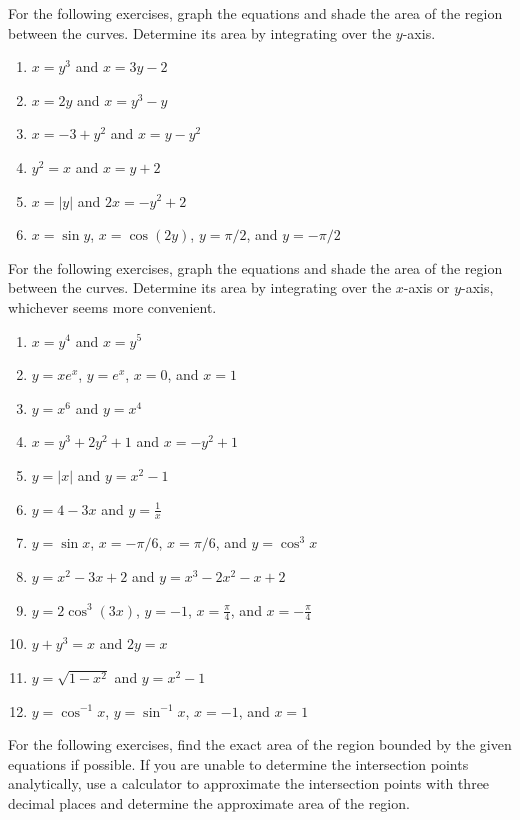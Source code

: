 \documentclass{exercises}
\begin{document}
For the following exercises, graph the equations and shade the area of the region between the curves. Determine its area by integrating over the $y$-axis.

\begin{enumerate}[resume]
\item $x=y^{3}$ and $x=3y-2$
\item $x=2y$ and $x=y^{3}-y$
\item $x=-3+y^{2}$ and $x=y-y^{2}$
\item $y^{2}=x$ and $x=y+2$
\item $x=|y|$ and $2x=-y^{2}+2$
\item $x=\sin y$, $x=\cos(2y)$, $y=\pi/2$, and $y=-\pi/2$
\end{enumerate}

For the following exercises, graph the equations and shade the area of the region between the curves. Determine its area by integrating over the $x$-axis or $y$-axis, whichever seems more convenient.

\begin{enumerate}[resume]
\item $x=y^{4}$ and $x=y^{5}$
\item $y=xe^{x}$, $y=e^{x}$, $x=0$, and $x=1$
\item $y=x^{6}$ and $y=x^{4}$
\item $x=y^{3}+2y^{2}+1$ and $x=-y^{2}+1$
\item $y=|x|$ and $y=x^{2}-1$
\item $y=4-3x$ and $y=\frac{1}{x}$
\item $y=\sin x$, $x=-\pi/6$, $x=\pi/6$, and $y=\cos^{3}x$
\item $y=x^{2}-3x+2$ and $y=x^{3}-2x^{2}-x+2$
\item $y=2\cos^{3}(3x)$, $y=-1$, $x=\frac{\pi}{4}$, and $x=-\frac{\pi}{4}$
\item $y+y^{3}=x$ and $2y=x$
\item $y=\sqrt{1-x^{2}}$ and $y=x^{2}-1$
\item $y=\cos^{-1}x$, $y=\sin^{-1}x$, $x=-1$, and $x=1$
\end{enumerate}

For the following exercises, find the exact area of the region bounded by the given equations if possible. If you are unable to determine the intersection points analytically, use a calculator to approximate the intersection points with three decimal places and determine the approximate area of the region.
\end{document}
